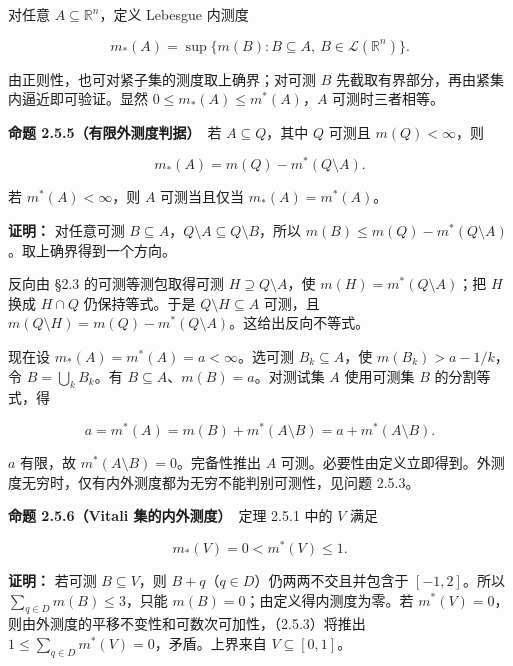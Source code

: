 \documentclass[11pt,a4paper]{article}
\begin{document}
对任意 \(A\subseteq\mathbb R^n\)，定义 Lebesgue 内测度

\begin{equation*}
m_*(A)=\sup\{m(B):B\subseteq A,\ B\in\mathcal L(\mathbb R^n)\}.
\tag{2.5.6}
\end{equation*}

由正则性，也可对紧子集的测度取上确界；对可测 \(B\)
先截取有界部分，再由紧集内逼近即可验证。显然
\(0\le m_*(A)\le m^*(A)\)，\(A\) 可测时三者相等。

\textbf{命题 2.5.5（有限外测度判据）}　若 \(A\subseteq Q\)，其中 \(Q\)
可测且 \(m(Q)<\infty\)，则

\begin{equation*}
m_*(A)=m(Q)-m^*(Q\setminus A).
\tag{2.5.7}
\end{equation*}

若 \(m^*(A)<\infty\)，则 \(A\) 可测当且仅当 \(m_*(A)=m^*(A)\)。

\textbf{证明：} 对任意可测
\(B\subseteq A\)，\(Q\setminus A\subseteq Q\setminus B\)，所以
\(m(B)\le m(Q)-m^*(Q\setminus A)\)。取上确界得到一个方向。

反向由 §2.3 的可测等测包取得可测 \(H\supseteq Q\setminus A\)，使
\(m(H)=m^*(Q\setminus A)\)；把 \(H\) 换成 \(H\cap Q\) 仍保持等式。于是
\(Q\setminus H\subseteq A\) 可测，且
\(m(Q\setminus H)=m(Q)-m^*(Q\setminus A)\)。这给出反向不等式。

现在设 \(m_*(A)=m^*(A)=a<\infty\)。选可测 \(B_k\subseteq A\)，使
\(m(B_k)>a-1/k\)，令 \(B=\bigcup_kB_k\)。有
\(B\subseteq A\)、\(m(B)=a\)。对测试集 \(A\) 使用可测集 \(B\)
的分割等式，得

\begin{equation*}
a=m^*(A)=m(B)+m^*(A\setminus B)=a+m^*(A\setminus B).
\end{equation*}

\(a\) 有限，故 \(m^*(A\setminus B)=0\)。完备性推出 \(A\)
可测。必要性由定义立即得到。外测度无穷时，仅有内外测度都为无穷不能判别可测性，见问题
2.5.3。

\textbf{命题 2.5.6（Vitali 集的内外测度）}　定理 2.5.1 中的 \(V\) 满足

\begin{equation*}
m_*(V)=0<m^*(V)\le1.
\tag{2.5.8}
\end{equation*}

\textbf{证明：} 若可测 \(B\subseteq V\)，则
\(B+q\)（\(q\in D\)）仍两两不交且并包含于 \([-1,2]\)。所以
\(\sum_{q\in D}m(B)\le3\)，只能 \(m(B)=0\)；由定义得内测度为零。若
\(m^*(V)=0\)，则由外测度的平移不变性和可数次可加性，（2.5.3）将推出
\(1\le\sum_{q\in D}m^*(V)=0\)，矛盾。上界来自 \(V\subseteq[0,1]\)。
\end{document}
